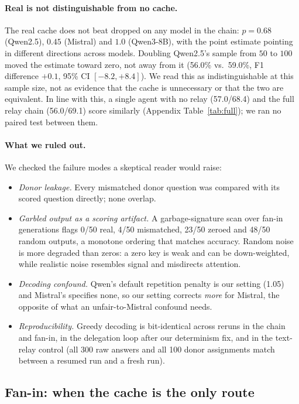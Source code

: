 \documentclass[11pt]{article}
\begin{document}
\paragraph{Real is not distinguishable from no cache.} The real cache does
not beat dropped on any model in the chain: $p=0.68$ (Qwen2.5), $0.45$ (Mistral) and
$1.0$ (Qwen3-8B), with the point estimate pointing in different
directions across models. Doubling Qwen2.5's sample from $50$ to $100$
moved the estimate toward zero, not away from it (56.0\% vs.\ 59.0\%, F1
difference $+0.1$, 95\% CI $[-8.2,+8.4]$). We read this as
indistinguishable at this sample size, not as evidence that the cache is
unnecessary or that the two are equivalent. In line with this, a single
agent with no relay (57.0/68.4) and the full relay chain (56.0/69.1) score
similarly (Appendix Table~\ref{tab:full}); we ran no paired test between
them.

\paragraph{What we ruled out.} We checked the failure modes a skeptical
reader would raise:
\begin{itemize}[leftmargin=*,itemsep=1pt,topsep=2pt]
\item \emph{Donor leakage.} Every mismatched donor question was compared with
its scored question directly; none overlap.
\item \emph{Garbled output as a scoring artifact.} A garbage-signature scan
over fan-in generations flags 0/50 real, 4/50 mismatched, 23/50 zeroed and
48/50 random outputs, a monotone ordering that matches accuracy. Random noise
is more degraded than zeros: a zero key is weak and can be down-weighted,
while realistic noise resembles signal and misdirects attention.
\item \emph{Decoding confound.} Qwen's default repetition penalty is our
setting (1.05) and Mistral's specifies none, so our setting corrects
\emph{more} for Mistral, the opposite of what an unfair-to-Mistral confound
needs.
\item \emph{Reproducibility.} Greedy decoding is bit-identical across reruns
in the chain and fan-in, in the delegation loop after our determinism fix, and in
the text-relay control (all 300 raw answers and all 100 donor assignments match
between a resumed run and a fresh run).
\end{itemize}

\subsection{Fan-in: when the cache is the only route}
\end{document}
